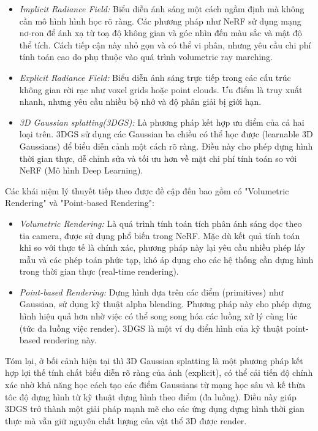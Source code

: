        \begin{itemize}
        	\item \textit{Implicit Radiance Field:} Biểu diễn ánh sáng một cách ngầm định mà không cần mô hình hình học rõ ràng. Các phương pháp như NeRF sử dụng mạng nơ-ron để ánh xạ từ toạ độ không gian và góc nhìn đến màu sắc và mật độ thể tích. Cách tiếp cận này nhỏ gọn và có thể vi phân, nhưng yêu cầu chi phí tính toán cao do phụ thuộc vào quá trình volumetric ray marching.
        	
        	\item \textit{Explicit Radiance Field:} Biểu diễn ánh sáng trực tiếp trong các cấu trúc không gian rời rạc như voxel grids hoặc point clouds. Ưu điểm là truy xuất nhanh, nhưng yêu cầu nhiều bộ nhớ và độ phân giải bị giới hạn.
        	
        	\item \textit{3D Gaussian splatting(3DGS):} Là phương pháp kết hợp ưu điểm của cả hai loại trên. 3DGS sử dụng các Gaussian ba chiều có thể học được (learnable 3D Gaussians) để biểu diễn cảnh một cách rõ ràng. Điều này cho phép dựng hình thời gian thực, dễ chỉnh sửa và tối ưu hơn về mặt chi phí tính toán so với NeRF (Mô hình Deep Learning). 
        \end{itemize}
        
        Các khái niệm lý thuyết tiếp theo được đề cập đến bao gồm có "Volumetric Rendering" và "Point-based Rendering":
        
        \begin{itemize}
        	\item \textit{Volumetric Rendering:} Là quá trình tính toán tích phân ánh sáng dọc theo tia camera, được sử dụng phổ biến trong NeRF. Mặc dù kết quả tính toán khi so với thực tế là chính xác, phương pháp này lại yêu cầu nhiều phép lấy mẫu và các phép toán phức tạp, khó áp dụng cho các hệ thống cần dựng hình trong thời gian thực (real-time rendering).
        	
        	\item \textit{Point-based Rendering:} Dựng hình dựa trên các điểm (primitives) như Gaussian, sử dụng kỹ thuật alpha blending. Phương pháp này cho phép dựng hình hiệu quả hơn nhờ việc có thể song song hóa các luồng xử lý cùng lúc (tức đa luồng việc render). 3DGS là một ví dụ điển hình của kỹ thuật point-based rendering này.
        \end{itemize}
        
        Tóm lại, ở bối cảnh hiện tại thì 3D Gaussian splatting là một phương pháp kết hợp lợi thế tính chất biểu diễn rõ ràng của ảnh (explicit), có thể cải tiến độ chính xác nhờ khả năng học cách tạo các điểm Gaussians từ mạng học sâu và kế thừa tôc độ dựng hình từ kỹ thuật dựng hình theo điểm (đa luồng). Điều này giúp 3DGS trở thành một giải pháp mạnh mẽ cho các ứng dụng dựng hình thời gian thực mà vẫn giữ nguyên chất lượng của vật thể 3D được render. \\

